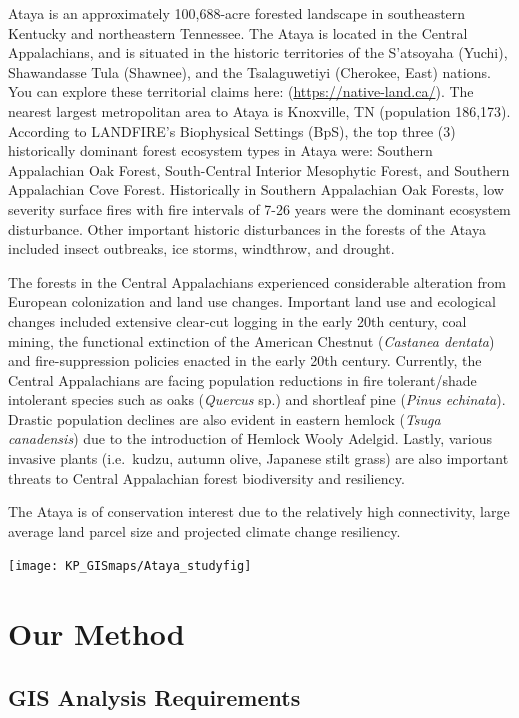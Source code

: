 \documentclass[
]{book}
\begin{document}
Ataya is an approximately 100,688-acre forested landscape in southeastern Kentucky and northeastern Tennessee. The Ataya is located in the Central Appalachians, and is situated in the historic territories of the S'atsoyaha (Yuchi), Shawandasse Tula (Shawnee), and the Tsalaguwetiyi (Cherokee, East) nations. You can explore these territorial claims here: (\url{https://native-land.ca/}). The nearest largest metropolitan area to Ataya is Knoxville, TN (population 186,173). According to LANDFIRE's Biophysical Settings (BpS), the top three (3) historically dominant forest ecosystem types in Ataya were: Southern Appalachian Oak Forest, South-Central Interior Mesophytic Forest, and Southern Appalachian Cove Forest. Historically in Southern Appalachian Oak Forests, low severity surface fires with fire intervals of 7-26 years were the dominant ecosystem disturbance. Other important historic disturbances in the forests of the Ataya included insect outbreaks, ice storms, windthrow, and drought.

The forests in the Central Appalachians experienced considerable alteration from European colonization and land use changes. Important land use and ecological changes included extensive clear-cut logging in the early 20th century, coal mining, the functional extinction of the American Chestnut (\emph{Castanea dentata}) and fire-suppression policies enacted in the early 20th century. Currently, the Central Appalachians are facing population reductions in fire tolerant/shade intolerant species such as oaks (\emph{Quercus} sp.) and shortleaf pine (\emph{Pinus echinata}). Drastic population declines are also evident in eastern hemlock (\emph{Tsuga canadensis}) due to the introduction of Hemlock Wooly Adelgid. Lastly, various invasive plants (i.e.~kudzu, autumn olive, Japanese stilt grass) are also important threats to Central Appalachian forest biodiversity and resiliency.

The Ataya is of conservation interest due to the relatively high connectivity, large average land parcel size and projected climate change resiliency.

\texttt{[image: KP\_GISmaps/Ataya\_studyfig]}

\hypertarget{ourmethods}{%
\chapter{Our Method}\label{ourmethods}}

\hypertarget{gis-analysis-requirements}{%
\section{GIS Analysis Requirements}\label{gis-analysis-requirements}}
\end{document}
